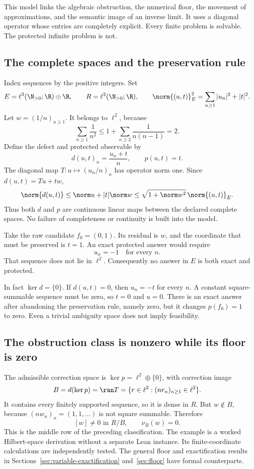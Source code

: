 \clearpage
{}\label{sec:escape}
This model links the algebraic obstruction, the numerical floor, the movement of approximations, and the semantic image of an inverse limit. It uses a diagonal operator whose entries are completely explicit. Every finite problem is solvable. The protected infinite problem is not.

\subsection{The complete spaces and the preservation rule}
Index sequences by the positive integers. Set
\[
 E=\ell^2(\N_{>0};\R)\oplus\R,\qquad
 R=\ell^2(\N_{>0};\R),\qquad
 \norm{(u,t)}_E^2=\sum_{n\ge1}|u_n|^2+|t|^2.
\]
Let \(w=(1/n)_{n\ge1}\). It belongs to \(\ell^2\), because
\[
 \sum_{n\ge1}\frac1{n^2}
 \le1+\sum_{n\ge2}\frac1{n(n-1)}=2.
\]
Define the defect and protected observable by
\[
 d(u,t)_n=\frac{u_n+t}{n},\qquad p(u,t)=t.
\]
The diagonal map \(T:u\mapsto(u_n/n)_n\) has operator norm one. Since \(d(u,t)=Tu+tw\),
\[
 \norm{d(u,t)}\le\norm u+|t|\norm w
 \le\sqrt{1+\norm w^2}\,\norm{(u,t)}_E.
\]
Thus both \(d\) and \(p\) are continuous linear maps between the declared complete spaces. No failure of completeness or continuity is built into the model.

Take the raw candidate \(f_0=(0,1)\). Its residual is \(w\), and the coordinate that must be preserved is \(t=1\). An exact protected answer would require
\[
 u_n=-1\quad\text{for every }n.
\]
That sequence does not lie in \(\ell^2\). Consequently no answer in \(E\) is both exact and protected.

In fact \(\ker d=\{0\}\). If \(d(u,t)=0\), then \(u_n=-t\) for every \(n\). A constant square-summable sequence must be zero, so \(t=0\) and \(u=0\). There is an exact answer after abandoning the preservation rule, namely zero, but it changes \(p(f_0)=1\) to zero. Even a trivial ambiguity space does not imply feasibility.

\subsection{The obstruction class is nonzero while its floor is zero}
The admissible correction space is \(\ker p=\ell^2\oplus\{0\}\), with correction image
\[
 B=d(\ker p)=\ran T
  =\{r\in\ell^2:(nr_n)_{n\ge1}\in\ell^2\}.
\]
It contains every finitely supported sequence, so it is dense in \(R\). But \(w\notin B\), because \((nw_n)_n=(1,1,\ldots)\) is not square summable. Therefore
\[
 [w]\ne0\text{ in }R/B,\qquad \nu_B(w)=0.
\]
This is the middle row of the preceding classification. The example is a worked Hilbert-space derivation without a separate Lean instance. Its finite-coordinate calculations are independently tested. The general floor and exactification results in Sections~\ref{sec:variable-exactification} and~\ref{sec:floor} have formal counterparts.

